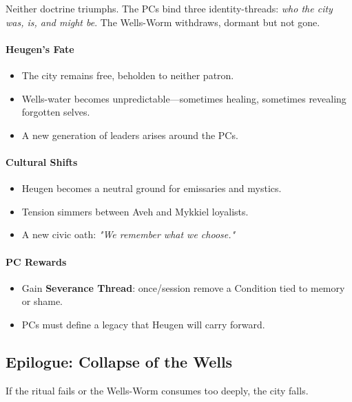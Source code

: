 \documentclass[11pt]{book}
\begin{document}
Neither doctrine triumphs. The PCs bind three identity-threads:
\emph{who the city was, is, and might be}. The Wells-Worm withdraws,
dormant but not gone.

\paragraph{Heugen's Fate}
\begin{itemize}[leftmargin=*]
    \item The city remains free, beholden to neither patron.
    \item Wells-water becomes unpredictable---sometimes healing,
          sometimes revealing forgotten selves.
    \item A new generation of leaders arises around the PCs.
\end{itemize}

\paragraph{Cultural Shifts}
\begin{itemize}[leftmargin=*]
    \item Heugen becomes a neutral ground for emissaries and mystics.
    \item Tension simmers between Aveh and Mykkiel loyalists.
    \item A new civic oath: \emph{"We remember what we choose."}
\end{itemize}

\paragraph{PC Rewards}
\begin{itemize}[leftmargin=*]
    \item Gain \textbf{Severance Thread}: once/session remove a Condition tied to memory or shame.
    \item PCs must define a legacy that Heugen will carry forward.
\end{itemize}

\subsection{Epilogue: Collapse of the Wells}

If the ritual fails or the Wells-Worm consumes too deeply, the city falls.
\end{document}
